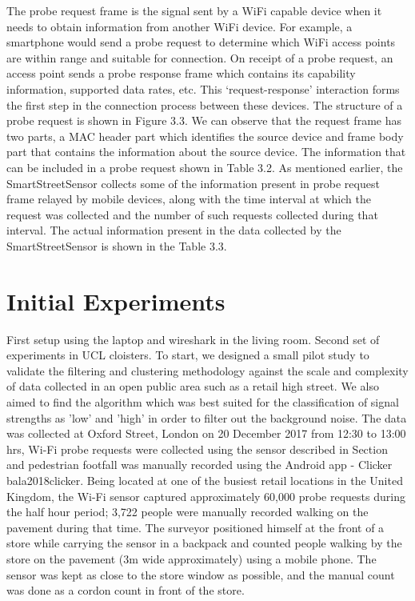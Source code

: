The probe request frame is the signal sent by a WiFi capable device when it needs to obtain information from another WiFi device.
For example, a smartphone would send a probe request to determine which WiFi access points are within range and suitable for connection.
On receipt of a probe request, an access point sends a probe response frame which contains its capability information, supported data rates, etc.
This ‘request-response’ interaction forms the first step in the connection process between these devices.
The structure of a probe request is shown in Figure 3.3.
We can observe that the request frame has two parts, a MAC header part which identifies the source device and frame body part that contains the information about the source device.
The information that can be included in a probe request shown in Table 3.2.
As mentioned earlier, the SmartStreetSensor collects some of the information present in probe request frame relayed by mobile devices, along with the time interval at which the request was collected and the number of such requests collected during that interval.
The actual information present in the data collected by the SmartStreetSensor is shown in the Table 3.3.

\section{Initial Experiments}

First setup using the laptop and wireshark in the living room.
Second set of experiments in UCL cloisters.
To start, we designed a small pilot study to validate the filtering and clustering methodology against the scale and complexity of data collected in an open public area such as a retail high street.
We also aimed to find the algorithm which was best suited for the classification of signal strengths as 'low' and 'high' in order to filter out the background noise.
The data was collected at Oxford Street, London on 20 December 2017 from 12:30 to 13:00 hrs, Wi-Fi probe requests were collected using the sensor described in Section and pedestrian footfall was manually recorded using the Android app - Clicker bala2018clicker.
Being located at one of the busiest retail locations in the United Kingdom, the Wi-Fi sensor captured approximately 60,000 probe requests during the half hour period; 3,722 people were manually recorded walking on the pavement during that time.
The surveyor positioned himself at the front of a store while carrying the sensor in a backpack and counted people walking by the store on the pavement (3m wide approximately) using a mobile phone.
The sensor was kept as close to the store window as possible, and the manual count was done as a cordon count in front of the store.

